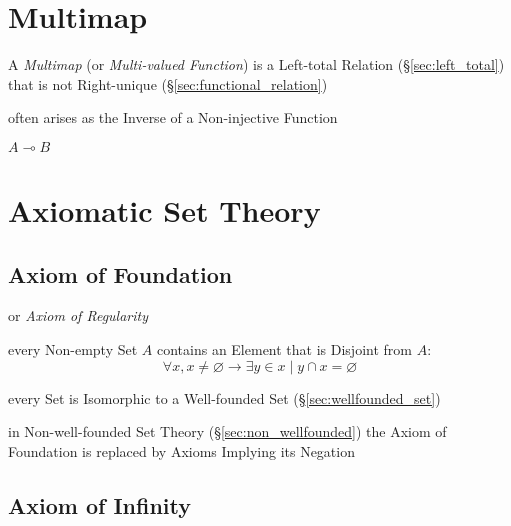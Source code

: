 \section{Multimap}\label{sec:multimap}

A \emph{Multimap} (or \emph{Multi-valued Function}) is a Left-total
Relation (\S\ref{sec:left_total}) that is not Right-unique
(\S\ref{sec:functional_relation})

often arises as the Inverse of a Non-injective Function

$A \multimap B$



\section{Axiomatic Set Theory}\label{sec:axiomatic_set_theory}

\subsection{Axiom of Foundation}\label{sec:foundation_axiom}

or \emph{Axiom of Regularity}

every Non-empty Set $A$ contains an Element that is Disjoint from $A$:
\[
  \forall x, x \neq \varnothing \rightarrow \exists y \in x \mid y
  \cap x = \varnothing
\]

every Set is Isomorphic to a Well-founded Set
(\S\ref{sec:wellfounded_set})

in Non-well-founded Set Theory (\S\ref{sec:non_wellfounded}) the Axiom
of Foundation is replaced by Axioms Implying its Negation



\subsection{Axiom of Infinity}\label{sec:infinity_axiom}

